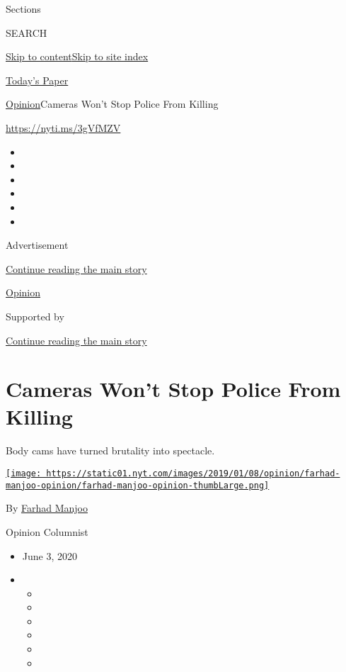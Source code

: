 Sections

SEARCH

\protect\hyperlink{site-content}{Skip to
content}\protect\hyperlink{site-index}{Skip to site index}

\href{https://myaccount.nytimes.com/auth/login?response_type=cookie\&client_id=vi}{}

\href{https://www.nytimes.com/section/todayspaper}{Today's Paper}

\href{/section/opinion}{Opinion}\textbar{}Cameras Won't Stop Police From
Killing

\href{https://nyti.ms/3gVfMZV}{https://nyti.ms/3gVfMZV}

\begin{itemize}
\item
\item
\item
\item
\item
\item
\end{itemize}

Advertisement

\protect\hyperlink{after-top}{Continue reading the main story}

\href{/section/opinion}{Opinion}

Supported by

\protect\hyperlink{after-sponsor}{Continue reading the main story}

\hypertarget{cameras-wont-stop-police-from-killing}{%
\section{Cameras Won't Stop Police From
Killing}\label{cameras-wont-stop-police-from-killing}}

Body cams have turned brutality into spectacle.

\href{https://www.nytimes.com/by/farhad-manjoo}{\texttt{[image: https://static01.nyt.com/images/2019/01/08/opinion/farhad-manjoo-opinion/farhad-manjoo-opinion-thumbLarge.png]}}

By \href{https://www.nytimes.com/by/farhad-manjoo}{Farhad Manjoo}

Opinion Columnist

\begin{itemize}
\item
  June 3, 2020
\item
  \begin{itemize}
  \item
  \item
  \item
  \item
  \item
  \item
  \end{itemize}
\end{itemize}

